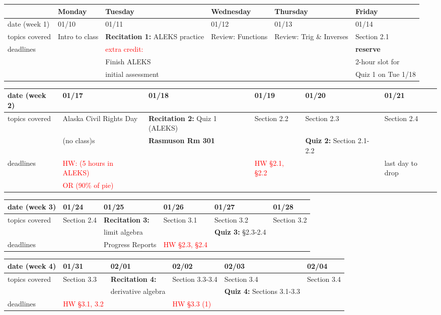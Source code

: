 \documentclass[11pt,fleqn]{article}
\begin{document}
\begin{tabularx}{\textwidth}{|X|| X | X | X | X | X |}
\hline
&Monday & Tuesday & Wednesday & Thursday & Friday \\
\hline \hline
\rowcolor{gray!20} 
date (week 1)&01/10&01/11&01/12&01/13&01/14\\
\hline
topics covered&Intro to class& \textbf{Recitation 1:} ALEKS practice&  Review: Functions & Review:  Trig \& Inverses&Section 2.1\\
\hline
deadlines&&\textcolor{red}{extra credit:} &&&\textbf{reserve}\\
&&Finish ALEKS&&&2-hour slot for\\
&& initial assessment &&& Quiz 1 on Tue 1/18\\
\hline 
\end{tabularx}
\vfill
\begin{tabularx}{\textwidth}{|X|| X | X | X | X | X |}
\hline
\rowcolor{gray!20}
date (week 2)&01/17&01/18&01/19&01/20&01/21\\ \hline
topics covered &Alaska Civil Rights Day&\textbf{Recitation 2:} Quiz 1 (ALEKS)& Section 2.2 &Section 2.3&Section 2.4\\ 
&(no class)s&\textbf{\textcolor{ddgreen}{Rasmuson Rm 301}}&&\textbf{Quiz 2:} Section 2.1-2.2&\\ \hline
deadlines&\textcolor{red}{HW: (5 hours in ALEKS)}&&\textcolor{red}{HW \S 2.1, \S 2.2}&&\textcolor{ddgreen}{last day to drop}\\ 
& \textcolor{red}{ OR (90\% of pie)}&&&& \\
 \hline 
 \end{tabularx}
 \vfill
\begin{tabularx}{\textwidth}{|X|| X | X | X | X | X |}
\hline
\rowcolor{gray!20}
date (week 3)&01/24&01/25&01/26&01/27&01/28\\ \hline
topics covered&Section 2.4&\textbf{Recitation 3:} &Section 3.1 &Section 3.2&Section 3.2\\
&&limit algebra&&\textbf{Quiz 3:} \S 2.3-2.4&\\ \hline
deadlines& & \textcolor{ddgreen}{Progress Reports}&\textcolor{red}{HW \S 2.3, \S 2.4}&& \\ \hline
\end{tabularx}
\vfill
\begin{tabularx}{\textwidth}{|X|| X | X | X | X | X |}
\hline
\rowcolor{gray!20}
date (week 4)&01/31&02/01&02/02&02/03&02/04\\ \hline
topics covered&Section 3.3&\textbf{Recitation 4:}&Section 3.3-3.4&Section 3.4&Section 3.4\\ 
&&derivative algebra&&\textbf{Quiz 4:} Sections 3.1-3.3& \\ \hline
deadlines&\textcolor{red}{HW \S 3.1, 3.2}& &\textcolor{red}{HW \S 3.3 (1)}&& \\ \hline 
\end{tabularx}
\end{document}
